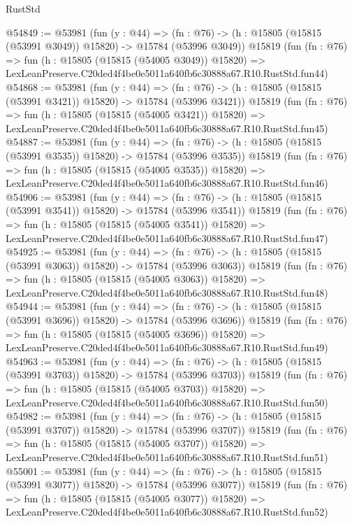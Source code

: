 \begin{lexlean}{RustStd}
\begin{coremodule}
@54849 := @53981
    (fun (y : @44) =>
    (fn : @76) -> (h : @15805 (@15815 (@53991 @3049)) @15820) -> @15784 (@53996 @3049))
    @15819
    (fun (fn : @76) =>
    fun (h : @15805 (@15815 (@54005 @3049)) @15820) =>
    LexLeanPreserve.C20ded4f4be0e5011a640fb6c30888a67.R10.RustStd.fun44)
@54868 := @53981
    (fun (y : @44) =>
    (fn : @76) -> (h : @15805 (@15815 (@53991 @3421)) @15820) -> @15784 (@53996 @3421))
    @15819
    (fun (fn : @76) =>
    fun (h : @15805 (@15815 (@54005 @3421)) @15820) =>
    LexLeanPreserve.C20ded4f4be0e5011a640fb6c30888a67.R10.RustStd.fun45)
@54887 := @53981
    (fun (y : @44) =>
    (fn : @76) -> (h : @15805 (@15815 (@53991 @3535)) @15820) -> @15784 (@53996 @3535))
    @15819
    (fun (fn : @76) =>
    fun (h : @15805 (@15815 (@54005 @3535)) @15820) =>
    LexLeanPreserve.C20ded4f4be0e5011a640fb6c30888a67.R10.RustStd.fun46)
@54906 := @53981
    (fun (y : @44) =>
    (fn : @76) -> (h : @15805 (@15815 (@53991 @3541)) @15820) -> @15784 (@53996 @3541))
    @15819
    (fun (fn : @76) =>
    fun (h : @15805 (@15815 (@54005 @3541)) @15820) =>
    LexLeanPreserve.C20ded4f4be0e5011a640fb6c30888a67.R10.RustStd.fun47)
@54925 := @53981
    (fun (y : @44) =>
    (fn : @76) -> (h : @15805 (@15815 (@53991 @3063)) @15820) -> @15784 (@53996 @3063))
    @15819
    (fun (fn : @76) =>
    fun (h : @15805 (@15815 (@54005 @3063)) @15820) =>
    LexLeanPreserve.C20ded4f4be0e5011a640fb6c30888a67.R10.RustStd.fun48)
@54944 := @53981
    (fun (y : @44) =>
    (fn : @76) -> (h : @15805 (@15815 (@53991 @3696)) @15820) -> @15784 (@53996 @3696))
    @15819
    (fun (fn : @76) =>
    fun (h : @15805 (@15815 (@54005 @3696)) @15820) =>
    LexLeanPreserve.C20ded4f4be0e5011a640fb6c30888a67.R10.RustStd.fun49)
@54963 := @53981
    (fun (y : @44) =>
    (fn : @76) -> (h : @15805 (@15815 (@53991 @3703)) @15820) -> @15784 (@53996 @3703))
    @15819
    (fun (fn : @76) =>
    fun (h : @15805 (@15815 (@54005 @3703)) @15820) =>
    LexLeanPreserve.C20ded4f4be0e5011a640fb6c30888a67.R10.RustStd.fun50)
@54982 := @53981
    (fun (y : @44) =>
    (fn : @76) -> (h : @15805 (@15815 (@53991 @3707)) @15820) -> @15784 (@53996 @3707))
    @15819
    (fun (fn : @76) =>
    fun (h : @15805 (@15815 (@54005 @3707)) @15820) =>
    LexLeanPreserve.C20ded4f4be0e5011a640fb6c30888a67.R10.RustStd.fun51)
@55001 := @53981
    (fun (y : @44) =>
    (fn : @76) -> (h : @15805 (@15815 (@53991 @3077)) @15820) -> @15784 (@53996 @3077))
    @15819
    (fun (fn : @76) =>
    fun (h : @15805 (@15815 (@54005 @3077)) @15820) =>
    LexLeanPreserve.C20ded4f4be0e5011a640fb6c30888a67.R10.RustStd.fun52)

\end{coremodule}
\end{lexlean}
